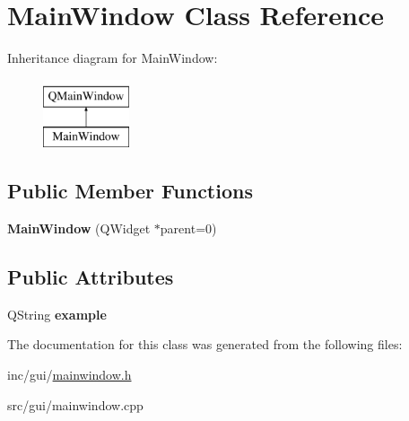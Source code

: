 \hypertarget{classMainWindow}{\section{Main\-Window Class Reference}
\label{classMainWindow}
}
Inheritance diagram for Main\-Window\-:\begin{figure}[H]
\begin{center}
\leavevmode
\includegraphics[height=2.000000cm]{classMainWindow}
\end{center}
\end{figure}
\subsection*{Public Member Functions}
\begin{DoxyCompactItemize}
\item 
\hypertarget{classMainWindow_a8b244be8b7b7db1b08de2a2acb9409db}{{\bfseries Main\-Window} (Q\-Widget $\ast$parent=0)}\label{classMainWindow_a8b244be8b7b7db1b08de2a2acb9409db}

\end{DoxyCompactItemize}
\subsection*{Public Attributes}
\begin{DoxyCompactItemize}
\item 
\hypertarget{classMainWindow_a624a009d3c1cc1a8f1ab586f09e8bc01}{Q\-String {\bfseries example}}\label{classMainWindow_a624a009d3c1cc1a8f1ab586f09e8bc01}

\end{DoxyCompactItemize}


The documentation for this class was generated from the following files\-:\begin{DoxyCompactItemize}
\item 
inc/gui/\hyperlink{mainwindow_8h}{mainwindow.\-h}\item 
src/gui/mainwindow.\-cpp\end{DoxyCompactItemize}
